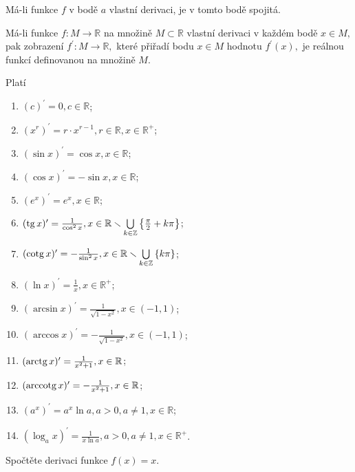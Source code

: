 \begin{veta}
Má-li funkce $f$ v bodě $a$ vlastní derivaci, je v tomto bodě spojitá.
\end{veta}

\begin{pozn}
    Má-li funkce $f\colon M\to \mathbb R$ na množině $M\subset \mathbb R$ vlastní derivaci
    v každém bodě $x\in M,$ pak zobrazení $f^\prime\colon M\to \mathbb R,$ které přiřadí
    bodu $x\in M$ hodnotu $f^\prime(x),$ je reálnou funkcí definovanou na množině $M$.
\end{pozn}

\begin{pozn}
Platí
\begin{enumerate}[$i.$]
\item $(c)^\prime = 0, c \in \mathbb R$;
\item $(x^r)^\prime = r\cdot x^{r-1}, r\in \mathbb R, x \in \mathbb R^+$;
\item $(\sin x)^\prime = \cos x, x \in \mathbb R$;
\item $(\cos x) ^\prime = -\sin x, x \in \mathbb R$;
\item $(e^x)^\prime = e^x,x \in \mathbb R$;
\item $(\operatorname{tg} x)^\prime = \frac{1}{\cos^2 x}, x \in \mathbb R \smallsetminus \bigcup\limits_{k\in \mathbb Z}\left \{ \frac{\pi}{2}+k\pi \right \}$;
\item $(\operatorname{cotg} x)^\prime = -\frac{1}{\sin^2 x}, x \in \mathbb R \smallsetminus \bigcup\limits_{k \in \mathbb Z}\left \{ k\pi \right \}$;
\item $(\ln x)^\prime = \frac{1}{x}, x \in \mathbb R^+$;
\item $(\arcsin x)^\prime = \frac{1}{\sqrt{1-x^2}}, x \in(-1,1)$;
\item $(\arccos x)^\prime=-\frac{1}{\sqrt{1-x^2} }, x \in (-1,1)$;
\item $(\operatorname{arctg} x)^\prime = \frac{1}{x^2+1}, x \in \mathbb R$;
\item $(\operatorname{arccotg} x)^\prime = -\frac{1}{x^2+1}, x \in \mathbb R$;
\item $(a^x)^\prime = a^x \ln a, a>0, a\ne 1, x\in \mathbb R$;
\item $(\log_a x)^\prime=\frac{1}{x\ln a}, a>0, a\ne 1, x \in \mathbb R^+$.
\end{enumerate}
\end{pozn}

\begin{priklad}
  Spočtěte derivaci funkce $f(x)=x.$
\end{priklad}

